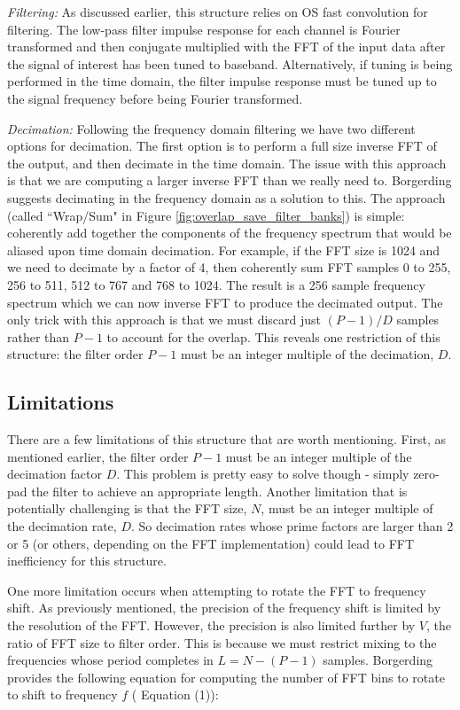 \documentclass[12pt]{article}
\begin{document}
\emph{Filtering:} As discussed earlier, this structure relies on OS fast
convolution for filtering. The low-pass filter impulse response for each
channel is Fourier transformed and then conjugate multiplied with the FFT of
the input data after the signal of interest has been tuned to baseband.
Alternatively, if tuning is being performed in the time domain, the filter
impulse response must be tuned up to the signal frequency before being Fourier
transformed.

\emph{Decimation:} Following the frequency domain filtering we have two
different options for decimation. The first option is to perform a full size
inverse FFT of the output, and then decimate in the time domain. The issue with
this approach is that we are computing a larger inverse FFT than we really need
to. Borgerding suggests decimating in the frequency domain as a solution to this.
The approach (called ``Wrap/Sum" in Figure
\ref{fig:overlap_save_filter_banks}) is simple: coherently add together the
components of the frequency spectrum that would be aliased upon time domain
decimation. For example, if the FFT size is 1024 and we need to decimate by
a factor of 4, then coherently sum FFT samples 0 to 255, 256 to 511, 512 to 
767 and 768 to 1024.  The result is a 256 sample frequency
spectrum which we can now inverse FFT to produce the decimated output. The
only trick with this approach is that we must discard just $(P-1)/D$
samples rather than $P-1$ to account for the overlap.  This reveals one
restriction of this structure: the filter order $P-1$ must be an integer
multiple of the decimation, $D$.

\subsection{Limitations}
\label{sec:os_limitations}
There are a few limitations of this structure that are worth mentioning. First,
as mentioned earlier, the filter order $P-1$ must be an integer multiple of the
decimation factor $D$. This problem is pretty easy to solve though - simply
zero-pad the filter to achieve an appropriate length. Another limitation that
is potentially challenging is that the FFT size, $N$, must be an integer
multiple of the decimation rate, $D$. So decimation rates whose prime factors
are larger than 2 or 5 (or others, depending on the FFT implementation) could
lead to FFT inefficiency for this structure.

One more limitation occurs when attempting to rotate the FFT to frequency
shift.  As previously mentioned, the precision of the frequency shift is
limited by the resolution of the FFT. However, the precision is also limited
further by $V$, the ratio of FFT size to filter order. This is because we must
restrict mixing to the frequencies whose period completes in $L=N-(P-1)$
samples. Borgerding provides the following equation for computing the number of
FFT bins to rotate to shift to frequency $f$ (\cite{Borgerding1} Equation (1)):
\end{document}
